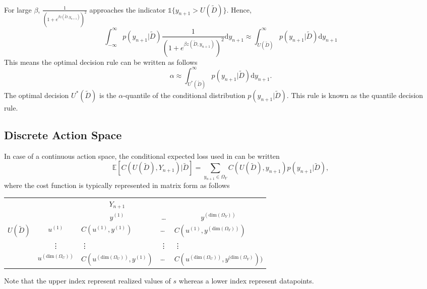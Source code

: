 \begin{example}
\begin{equation}
\begin{split}
		\end{split}
	\end{equation}
	For large $\beta$, $\frac{1}{(1+e^{\beta z(\tilde{D},y_{n+1})})^2}$ approaches the indicator $\mathbb{1}\{y_{n+1}>U(\tilde{D})\}$. Hence,
	\begin{equation}
		\int_{-\infty}^{\infty} p(y_{n+1}|\tilde{D})\frac{1}{(1+e^{\beta z(\tilde{D},y_{n+1})})^2} \mathrm{d}y_{n+1} \approx \int_{U(\tilde{D})}^{\infty} p(y_{n+1}|\tilde{D}) \mathrm{d}y_{n+1}
	\end{equation}
	This means the optimal decision rule can be written as follows
	\begin{equation}
		\alpha \approx \int_{U^*(\tilde{D})}^{\infty} p(y_{n+1}|\tilde{D}) \mathrm{d}y_{n+1}.
		\label{eq:quantile_decision_rule}
	\end{equation}
	The optimal decision $U^*(\tilde{D})$ is the $\alpha$-quantile of the conditional distribution $p(y_{n+1}|\tilde{D})$. This rule is known as the quantile decision rule.
\end{example}

\subsection{Discrete Action Space}
In case of a continuous action space, the conditional expected loss used in  can be written
\begin{equation}
	\mathbb{E}[C(U(\tilde{D}), Y_{n+1})|\tilde{D}] = \sum_{y_{n+1}\in \Omega_Y}C(U(\tilde{D}),y_{n+1})p(y_{n+1}|\tilde{D}),
	\label{eq:conditional_cost_discrete}
\end{equation}
where the cost function is typically represented in matrix form as follows
\begin{center}
	\begin{tabular}{ c  c  c  c  c  }
		&& $Y_{n+1}$& & \\
		&& $y^{(1)}$ & \dots & $y^{(\text{dim}(\Omega_Y))}$ \\
		\cline{3-5}
		$U(\tilde{D})$ & $u^{(1)}$& \multicolumn{1}{|l}{$C(u^{(1)}, y^{(1)})$} &\multicolumn{1}{l}{\dots}&\multicolumn{1}{l|}{$C(u^{(1)}, y^{(\text{dim}(\Omega_Y))})$} \\
		& \vdots & \multicolumn{1}{|l}{\vdots} &\multicolumn{1}{l}{\vdots}&\multicolumn{1}{l|}{\vdots} \\
		& $u^{(\text{dim}(\Omega_U))}$ & \multicolumn{1}{|l}{$C(u^{(\text{dim}(\Omega_U))}, y^{(1)})$} &\multicolumn{1}{l}{\dots}&\multicolumn{1}{l|}{$C(u^{(\text{dim}(\Omega_U))}, y^{(\text{dim}(\Omega_Y)}))$} \\
		\cline{3-5}
	\end{tabular}
\end{center}
Note that the upper index represent realized values of $s$ whereas a lower index represent datapoints.

